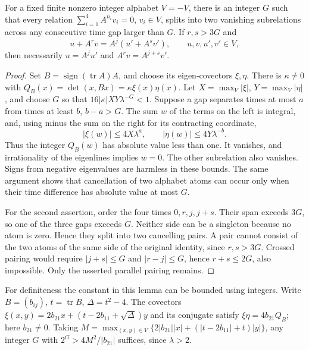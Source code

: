 \begin{lemma}\label{lem:four-atom-separation}
For a fixed finite nonzero integer alphabet $V=-V$, there is an integer $G$
such that every relation $\sum_{i=1}^4 A^{n_i}v_i=0$, $v_i\in V$, splits
into two vanishing subrelations across any consecutive time gap larger than $G$.
If $r,s>3G$ and
\[
 u+A^rv=A^j(u'+A^sv'),\qquad u,v,u',v'\in V,
\]
then necessarily $u=A^ju'$ and $A^rv=A^{j+s}v'$.
\end{lemma}
\begin{proof}
Set $B=\operatorname{sign}(\operatorname{tr}A)A$, and choose its eigen-covectors
$\xi,\eta$. There is $\kappa\ne0$ with
$Q_B(x)=\det(x,Bx)=\kappa\xi(x)\eta(x)$.
Let $X=\max_V|\xi|$, $Y=\max_V|\eta|$, and choose $G$ so that
$16|\kappa|XY\lambda^{-G}<1$.
Suppose a gap separates times at most $a$ from times at least $b$, $b-a>G$.
The sum $w$ of the terms on the left is integral, and, using minus the sum
on the right for its contracting coordinate,
\[
 |\xi(w)|\le4X\lambda^a,\qquad |\eta(w)|\le4Y\lambda^{-b}.
\]
Thus the integer $Q_B(w)$ has absolute value less than one. It vanishes,
and irrationality of the eigenlines implies $w=0$. The other subrelation
also vanishes. Signs from negative eigenvalues are harmless in these bounds.
The same argument shows that cancellation of two alphabet atoms can occur
only when their time difference has absolute value at most $G$.

For the second assertion, order the four times $0,r,j,j+s$. Their span
exceeds $3G$, so one of the three gaps exceeds $G$. Neither side can be a
singleton because no atom is zero. Hence they split into two cancelling pairs.
A pair cannot consist of the two atoms of the same side of the original
identity, since $r,s>3G$. Crossed pairing would require
$|j+s|\le G$ and $|r-j|\le G$, hence $r+s\le2G$, also impossible.
Only the asserted parallel pairing remains.
\end{proof}

For definiteness the constant in this lemma can be bounded using integers.
Write $B=(b_{ij})$, $t=\operatorname{tr}B$, $\Delta=t^2-4$.
The covectors
$\xi(x,y)=2b_{21}x+(t-2b_{11}+\sqrt\Delta)y$ and its conjugate satisfy
$\xi\eta=4b_{21}Q_B$; here $b_{21}\ne0$.
Taking
$M=\max_{(x,y)\in V}\{2|b_{21}||x|+(|t-2b_{11}|+t)|y|\}$,
any integer $G$ with $2^G>4M^2/|b_{21}|$ suffices, since $\lambda>2$.

